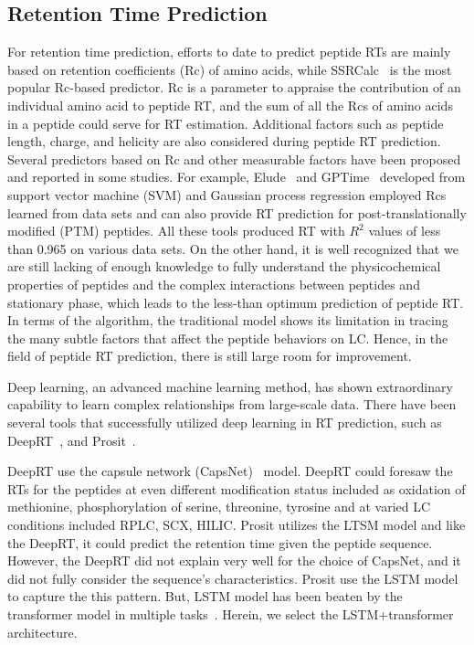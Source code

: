 \subsection{Retention Time Prediction}
For retention time prediction, efforts to date to predict peptide RTs are mainly based on retention coefficients (Rc) of amino acids,
while SSRCalc~\cite{guo1986prediction} is the most popular Rc-based predictor. Rc is a parameter to appraise the contribution of an individual amino
acid to peptide RT, and the sum of all the Rcs of amino acids in a peptide could serve for RT estimation.
Additional factors such as peptide length, charge, and helicity are also considered during peptide RT prediction.
Several predictors based on Rc and other measurable factors have been proposed and reported in some studies. For example, Elude~\cite{moruz2010training,moruz2012chromatographic} and GPTime~\cite{maboudi2017uncertainty} developed from support vector machine (SVM) and Gaussian process
regression employed Rcs learned from data sets and can also provide RT prediction for post-translationally modiﬁed (PTM) peptides.
All these tools produced RT with $R^2$ values of less than 0.965 on various data sets. On the other hand, it is well recognized
that we are still lacking of enough knowledge to fully understand the physicochemical properties of peptides and the complex
interactions between peptides and stationary phase, which leads to the less-than optimum prediction of peptide RT. In terms
of the algorithm, the traditional model shows its limitation in tracing the many subtle factors that affect the peptide behaviors
on LC. Hence, in the ﬁeld of peptide RT prediction, there is still large room for improvement.

Deep learning, an advanced machine learning method, has shown extraordinary capability to learn complex relationships
from large-scale data. There have been several tools that successfully utilized deep learning in RT prediction, such as
DeepRT~\cite{ma2018improved}, and Prosit~\cite{gessulat2019prosit}.

DeepRT use the capsule network (CapsNet)~\cite{sabour2017dynamic}
model. DeepRT could foresaw the RTs for the peptides at even different modiﬁcation status included as oxidation of methionine, phosphorylation of
serine, threonine, tyrosine and at varied LC conditions included RPLC, SCX, HILIC.
Prosit utilizes the LTSM model and like the DeepRT, it could predict the retention time given the peptide sequence.
However, the DeepRT did not explain very well for the choice of CapsNet, and it did not fully consider the sequence's characteristics.
Prosit use the LSTM model to capture the this pattern. But, LSTM model has been beaten by the transformer model
in multiple tasks~\cite{vaswani2017attention}. Herein, we select the LSTM+transformer architecture.

